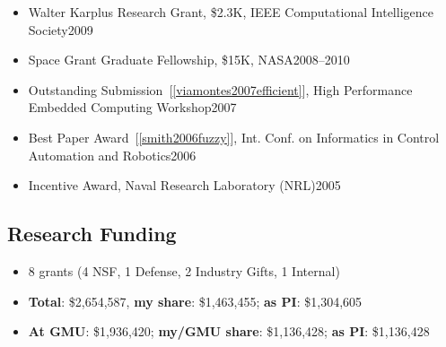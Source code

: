 \documentclass[11pt]{article}
\begin{document}
\begin{itemize}
\item Walter Karplus Research Grant, \$2.3K, IEEE Computational Intelligence Society\hfill 2009 
\item Space Grant Graduate Fellowship, \$15K, NASA\hfill 2008--2010 
\item Outstanding Submission~[\ref{viamontes2007efficient}], High Performance Embedded Computing Workshop\hfill 2007
\item  Best Paper Award~[\ref{smith2006fuzzy}],  Int. Conf. on Informatics in Control Automation and Robotics\hfill 2006
\item Incentive Award,  Naval Research Laboratory (NRL)\hfill 2005
\end{itemize}


\subsection{Research Funding}
\begin{itemize}[label={},before=\small]
\item 8 grants (4 NSF, 1 Defense, 2 Industry Gifts, 1 Internal)

\item \textbf{Total}: \$2,654,587, \textbf{my share}: \$1,463,455;  \textbf{as PI}: \$1,304,605
\item \textbf{At GMU}: \$1,936,420; \textbf{my/GMU share}: \$1,136,428; \textbf{as PI}: \$1,136,428
\end{itemize}
\end{document}
